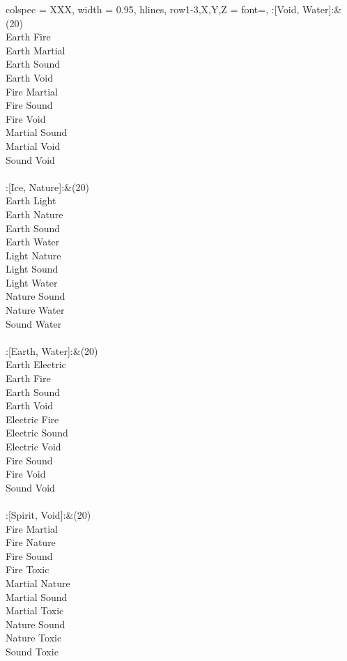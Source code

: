 \begin{longtblr}[
	caption = {2v2 Defending Resisted},
	label = {2v2-Defending-Resisted},
]{
	colspec = {XXX}, width = 0.95\linewidth,
	hlines,
	row{1-3,X,Y,Z} = {font=\bfseries},
}
	:[Void, Water]:&{(20)\\
	Earth Fire \\
	Earth Martial \\
	Earth Sound \\
	Earth Void \\
	Fire Martial \\
	Fire Sound \\
	Fire Void \\
	Martial Sound \\
	Martial Void \\
	Sound Void \\
	}\\

	:[Ice, Nature]:&{(20)\\
	Earth Light \\
	Earth Nature \\
	Earth Sound \\
	Earth Water \\
	Light Nature \\
	Light Sound \\
	Light Water \\
	Nature Sound \\
	Nature Water \\
	Sound Water \\
	}\\

	:[Earth, Water]:&{(20)\\
	Earth Electric \\
	Earth Fire \\
	Earth Sound \\
	Earth Void \\
	Electric Fire \\
	Electric Sound \\
	Electric Void \\
	Fire Sound \\
	Fire Void \\
	Sound Void \\
	}\\

	:[Spirit, Void]:&{(20)\\
	Fire Martial \\
	Fire Nature \\
	Fire Sound \\
	Fire Toxic \\
	Martial Nature \\
	Martial Sound \\
	Martial Toxic \\
	Nature Sound \\
	Nature Toxic \\
	Sound Toxic \\
	}\\


\end{longtblr}
